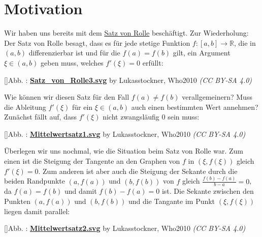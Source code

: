 \documentclass[fontsize=9pt,
               parskip=half-,
               DIV=14,
               listof=chapterentry,
               tocflat]{scrbook}
\newcounter{imagelabel}
\begin{document}
\section{Motivation}

Wir haben uns bereits mit dem \href{https://de.wikibooks.org/wiki/Mathe\_für\_Nicht-Freaks:\_Satz\_von\_Rolle}
{Satz von Rolle} beschäftigt. Zur Wiederholung: Der Satz von Rolle besagt, dass es für jede stetige Funktion $f:[a,b]\to \mathbb {R} $, die in $(a,b)$ differenzierbar ist und für die $f(a)=f(b)$ gilt, ein Argument $\xi \in (a,b)$ geben muss, welches $f'(\xi )=0$ erfüllt:

[]{Abb. : \protect\href{https://commons.wikimedia.org/wiki/File:Satz_von_Rolle3.svg}{\textbf{Satz\allowbreak\_von\allowbreak\_Rolle3.svg}} by Lukasstockner, Who2010 \textit{(CC BY-SA 4.0)}}\begin{center}
\end{center}

Wie können wir diesen Satz für den Fall $f(a)\neq f(b)$ verallgemeinern? Muss die Ableitung $f'(\xi )$ für ein $\xi \in (a,b)$ auch einen bestimmten Wert annehmen? Zunächst fällt auf, dass $f'(\xi )$ nicht zwangsläufig $0$ sein muss:

[]{Abb. : \protect\href{https://commons.wikimedia.org/wiki/File:Mittelwertsatz1.svg}{\textbf{Mittelwertsatz1.svg}} by Lukasstockner, Who2010 \textit{(CC BY-SA 4.0)}}\begin{center}
\end{center}

Überlegen wir uns nochmal, wie die Situation beim Satz von Rolle war. Zum einen ist die Steigung der Tangente an den Graphen von $f$ in $(\xi ,f(\xi ))$ gleich $f'(\xi )=0$. Zum anderen ist aber auch die Steigung der Sekante durch die beiden Randpunkte $(a,f(a))$ und $(b,f(b))$ von $f$ gleich ${\tfrac {f(b)-f(a)}{b-a}}=0$, da $f(a)=f(b)$ und damit $f(b)-f(a)=0$ ist. Die Sekante zwischen den Punkten $(a,f(a))$ und $(b,f(b))$ und die Tangante im Punkt $(\xi ,f(\xi ))$ liegen damit parallel:

[]{Abb. : \protect\href{https://commons.wikimedia.org/wiki/File:Mittelwertsatz2.svg}{\textbf{Mittelwertsatz2.svg}} by Lukasstockner, Who2010 \textit{(CC BY-SA 4.0)}}\begin{center}
\end{center}
\end{document}

